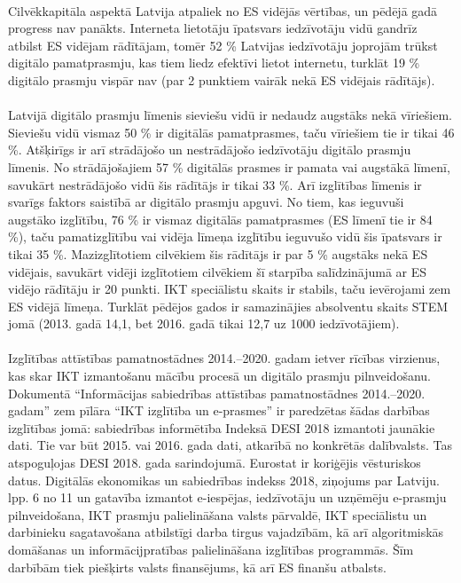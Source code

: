 \paragraph{}
Cilvēkkapitāla aspektā Latvija atpaliek no ES vidējās vērtības, un pēdējā gadā progress nav
panākts. Interneta lietotāju īpatsvars iedzīvotāju vidū gandrīz atbilst ES vidējam rādītājam,
tomēr 52 \% Latvijas iedzīvotāju joprojām trūkst digitālo pamatprasmju, kas tiem liedz efektīvi
lietot internetu, turklāt 19 \% digitālo prasmju vispār nav (par 2 punktiem vairāk nekā ES
vidējais rādītājs).
\paragraph{}
Latvijā digitālo prasmju līmenis sieviešu vidū ir nedaudz augstāks nekā vīriešiem. Sieviešu
vidū vismaz 50 \% ir digitālās pamatprasmes, taču vīriešiem tie ir tikai 46 \%. Atšķirīgs ir arī
strādājošo un nestrādājošo iedzīvotāju digitālo prasmju līmenis. No strādājošajiem 57 \%
digitālās prasmes ir pamata vai augstākā līmenī, savukārt nestrādājošo vidū šis rādītājs ir
tikai 33 \%. Arī izglītības līmenis ir svarīgs faktors saistībā ar digitālo prasmju apguvi. No tiem,
kas ieguvuši augstāko izglītību, 76 \% ir vismaz digitālās pamatprasmes (ES līmenī tie ir
84 \%), taču pamatizglītību vai vidēja līmeņa izglītību ieguvušo vidū šis īpatsvars ir tikai 35 \%.
Mazizglītotiem cilvēkiem šis rādītājs ir par 5 \% augstāks nekā ES vidējais, savukārt vidēji
izglītotiem cilvēkiem šī starpība salīdzinājumā ar ES vidējo rādītāju ir 20 punkti. IKT
speciālistu skaits ir stabils, taču ievērojami zem ES vidējā līmeņa. Turklāt pēdējos gados ir
samazinājies absolventu skaits STEM jomā (2013. gadā 14,1, bet 2016. gadā tikai 12,7 uz
1000 iedzīvotājiem).
\paragraph{}
Izglītības attīstības pamatnostādnes 2014.–2020. gadam ietver rīcības virzienus, kas skar
IKT izmantošanu mācību procesā un digitālo prasmju pilnveidošanu. Dokumentā
“Informācijas sabiedrības attīstības pamatnostādnes 2014.–2020. gadam” zem pīlāra “IKT
izglītība un e-prasmes” ir paredzētas šādas darbības izglītības jomā: sabiedrības informētība
Indeksā DESI 2018 izmantoti jaunākie dati. Tie var būt 2015. vai 2016. gada dati, atkarībā no konkrētās
dalībvalsts. Tas atspoguļojas DESI 2018. gada sarindojumā. Eurostat ir koriģējis vēsturiskos datus.
Digitālās ekonomikas un sabiedrības indekss 2018, ziņojums par Latviju. lpp. 6 no 11
un gatavība izmantot e-iespējas, iedzīvotāju un uzņēmēju e-prasmju pilnveidošana, IKT
prasmju palielināšana valsts pārvaldē, IKT speciālistu un darbinieku sagatavošana atbilstīgi
darba tirgus vajadzībām, kā arī algoritmiskās domāšanas un informācijpratības palielināšana
izglītības programmās. Šīm darbībām tiek piešķirts valsts finansējums, kā arī ES finanšu
atbalsts.
